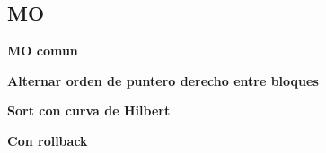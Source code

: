 \subsection{MO}
    \textbf{MO comun}
    

    \textbf{Alternar orden de puntero derecho entre bloques}
    

    \textbf{Sort con curva de Hilbert}
    

    \textbf{Con rollback}
    